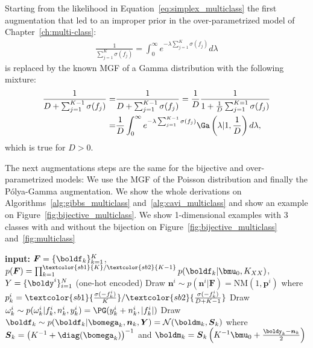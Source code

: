 Starting from the likelihood in Equation~\ref{eq:simplex_multiclass} the first augmentation that led to an improper prior in the over-parametrized model of Chapter~\ref{ch:multi-class}:
\begin{align*}
    \frac{1}{\sum_{j=1}^{K} \sigma(f_j)} = \int_0^\infty e^{-\lambda  \sum_{j=1}^{K} \sigma(f_j)}d\lambda
\end{align*}
is replaced by the known \ac{MGF} of a Gamma distribution with the following mixture:
\begin{align*}
    \frac{1}{D + \sum_{j=1}^{K-1} \sigma(f_j)} =& \frac{1}{D + \sum_{j=1}^{K-1} \sigma(f_j)} = \frac{1}{D}\frac{1}{1+\frac{1}{D}\sum_{j=1}^{K=1}\sigma(f_j)}\\
    =& \frac{1}{D}\int_0^\infty e^{-\lambda \sum_{j=1}^{K-1} \sigma(f_j)}\Ga \left(\lambda|1, \frac{1}{D}\right)d\lambda,
\end{align*}
which is true for $D > 0$.

The next augmentations steps are the same for the bijective and over-parametrized models:
We use the \ac{MGF} of the Poisson distribution and finally the P\'olya-Gamma augmentation.
We show the whole derivations on Algorithms~\ref{alg:gibbs_multiclass} and~\ref{alg:cavi_multiclass} and show an example on Figure~\ref{fig:bijective_multiclass}.
We show 1-dimensional examples with 3 classes with and without the bijection on Figure~\ref{fig:bijective_multiclass} and~\ref{fig:multiclass}
\begin{algorithm}[H]
    \caption{Gibbs sampling updates: $\textcolor{sb1}{K}/\textcolor{sb2}{K - 1}$ latent \acp{GP} for $K$ classes}
    \begin{algorithmic}
    \State \textbf{input:} $\boldsymbol{F} = \{\boldf_k\}_{k=1}^K$, $p(\boldsymbol{F}) = \prod_{k=1}^{\textcolor{sb1}{K}/\textcolor{sb2}{K - 1}} p(\boldf_k|\bmu_0, K_{XX})$, $Y=\{\boldy^i\}_{i=1}^N$ (one-hot encoded)
        \State Draw $\boldsymbol{n}^i \sim p(\boldsymbol{n}^i|\boldsymbol{F}) = \mathrm{NM}(1, \boldsymbol{p}^i)$ where 
        $p_k^i = \textcolor{sb1}{\frac{\sigma(-f_k^i)}{K}}/\textcolor{sb2}{\frac{\sigma(-f_k^i)}{D + K - 1}}$
        \State Draw $\omega_k^i \sim p(\omega_k^i|f_k^i, n_k^i, y_k^i) = \PG(y_k^i + n^i_k, |f_k^i|)$
        \State Draw $\boldf_k \sim p(\boldf_k|\bomega_k,\boldsymbol{n}_k, \boldsymbol{Y}) = \mathcal{N}(\boldm_k, \boldsymbol{S}_k)$
        \State where $\boldsymbol{S}_k = \left(K^{-1} + \diag(\bomega_k)\right)^{-1}$ and $\boldm_k = \boldsymbol{S}_k\left(K^{-1}\bmu_0 + \frac{\boldy_k - \boldsymbol{n}_k}{2}\right)$
    \EndFor
    \end{algorithmic}
    \label{alg:gibbs_multiclass}
\end{algorithm}

